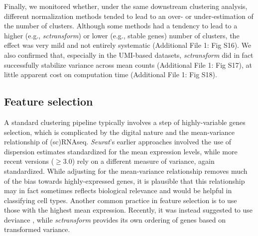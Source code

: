 \documentclass{bmcart}
\begin{document}
Finally, we monitored whether, under the same downstream clustering analysis, different normalization methods tended to lead to an over- or under-estimation of the number of clusters. Although some methods had a tendency to lead to a higher (e.g., \textit{sctransform}) or lower (e.g., stable genes) number of clusters, the effect was very mild and not entirely systematic (Additional File 1: Fig S16). We also confirmed that, especially in the UMI-based datasets, \textit{sctransform} did in fact successfully stabilize variance across mean counts (Additional File 1: Fig S17), at little apparent cost on computation time (Additional File 1: Fig S18).

\subsection*{Feature selection}

A standard clustering pipeline typically involves a step of highly-variable genes selection, which is complicated by the digital nature and the mean-variance relationship of (sc)RNAseq. \textit{Seurat}'s earlier approaches involved the use of dispersion estimates standardized for the mean expression levels, while more recent versions ($\geq$3.0) rely on a different measure of variance, again standardized. While adjusting for the mean-variance relationship removes much of the bias towards highly-expressed genes, it is plausible that this relationship may in fact sometimes reflects biological relevance and would be helpful in classifying cell types. Another common practice in feature selection is to use those with the highest mean expression. Recently, it was instead suggested to use deviance \cite{townesGlmpca2019}, while \textit{sctransform} provides its own ordering of genes based on transformed variance.
\end{document}
